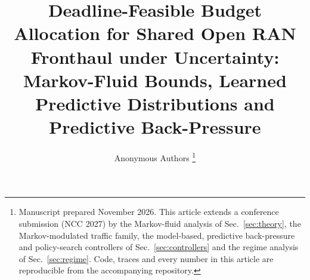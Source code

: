 \documentclass[journal]{IEEEtran}
\begin{document}
\title{Deadline-Feasible Budget Allocation for Shared Open RAN Fronthaul under Uncertainty:\\ Markov-Fluid Bounds, Learned Predictive Distributions and Predictive Back-Pressure}

\author{Anonymous Authors%
\thanks{Manuscript prepared November 2026. This article extends a conference submission (NCC 2027) by the Markov-fluid analysis of Sec.~\ref{sec:theory}, the Markov-modulated traffic family, the model-based, predictive back-pressure and policy-search controllers of Sec.~\ref{sec:controllers} and the regime analysis of Sec.~\ref{sec:regime}. Code, traces and every number in this article are reproducible from the accompanying repository.}}

\maketitle
\end{document}
